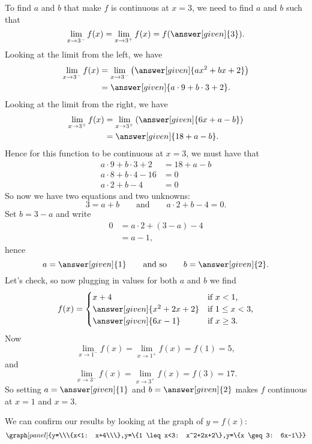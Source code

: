 \documentclass{ximera}
\begin{document}
\begin{example}
\begin{explanation}
To find $a$ and $b$ that make $f$ is continuous at $x=3$, we need to
find $a$ and $b$ such that
\[
\lim_{x\to 3^-} f(x) =\lim_{x\to 3^+}f(x) =f(\answer[given]{3}).
\]
Looking at the limit from the left, we have
\begin{align*}
  \lim_{x\to 3^-} f(x) &= \lim_{x\to 3^-} \left(\answer[given]{ax^2+bx+2}\right) \\
  &=\answer[given]{a\cdot 9 + b\cdot 3 + 2}.
\end{align*}
Looking at the limit from the right, we have
\begin{align*}
  \lim_{x\to 3^+} f(x) &= \lim_{x\to 3^+} \left(\answer[given]{6x+a-b}\right) \\
  &= \answer[given]{18+a-b}.
\end{align*}
Hence for this function to be continuous at $x=3$, we must have that
\begin{align*}
  a\cdot 9 + b\cdot 3 + 2 &= 18+a-b\\
  a\cdot 8 + b\cdot 4 -16 &= 0\\
  a\cdot 2 + b -4 &= 0
\end{align*}
So now we have two equations and two unknowns:
\[
 3=a+b \qquad\text{and}\qquad a\cdot 2 + b -4 = 0.
 \]
 Set $b = 3-a$ and write
 \begin{align*}
   0&= a\cdot 2 + (3-a) -4 \\
   &= a -1,
 \end{align*}
 hence
 \[
 a=\answer[given]{1}\qquad\text{and so}\qquad b =\answer[given]{2}.
 \]
 Let's check, so now plugging in values for both $a$ and $b$ we find
 \[
 f(x) = 
 \begin{cases}
   x+4 &\text{if $x<1$,}\\
   \answer[given]{x^2+2x+2} &\text{if $1\le x< 3$,}\\
   \answer[given]{6x-1} &\text{if $x\ge 3$.}
\end{cases}
 \]
 Now
 \[
 \lim_{x\to 1^-} f(x) =\lim_{x\to 1^+}f(x) =f(1) =  5,
 \]
 and
 \[
 \lim_{x\to 3^-} f(x) =\lim_{x\to 3^+}f(x) =f(3) = 17.  
 \]
 So setting $a= \answer[given]{1}$ and $b=\answer[given]{2}$ makes $f$ continuous at $x=1$ and $x=3$.
 \begin{prompt}
   We can confirm our results by looking at the graph of $y=f(x)$:
   \[
   \graph[panel]{y=\\\{x<1: x+4\\\},y=\{1 \leq x<3: x^2+2x+2\},y=\{x \geq 3: 6x-1\}}
   \]
 \end{prompt}
\end{explanation}
\end{example}
\end{document}
